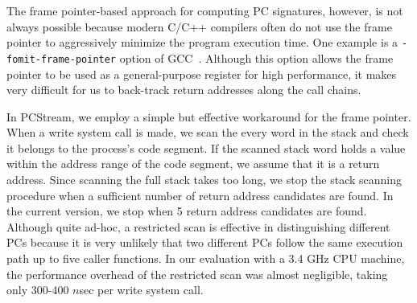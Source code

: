 
The frame pointer-based approach for computing PC signatures, however, is not
always possible because modern C/C++ compilers often do not use the frame
pointer to aggressively minimize the program execution time.
One example is a
{\tt -fomit-frame-pointer} option of GCC~\cite{GCC}. 
Although this option allows the frame pointer to be used as a general-purpose
register for high performance, it makes very difficult for us to back-track
return addresses along the call chains.  

In PCStream, we employ a simple but effective workaround for the frame pointer.
When a write system call is made, we scan the every word in the stack and check
it belongs to the process's code segment.  If the scanned stack word holds a
value within the address range of the code segment, we assume that it is a
return address.  Since scanning the full stack takes too long, we stop the
stack scanning procedure when a sufficient number of return address candidates
are found.  In the current version, we stop when 5 return address candidates
are found.  Although quite ad-hoc, a restricted scan is effective in
distinguishing different PCs because it is very unlikely that two different PCs
follow the same execution path up to five caller functions.   In our evaluation
with a 3.4 GHz CPU machine, the performance overhead of the restricted scan was
almost negligible, taking only 300-400 $n$sec per write system call.

